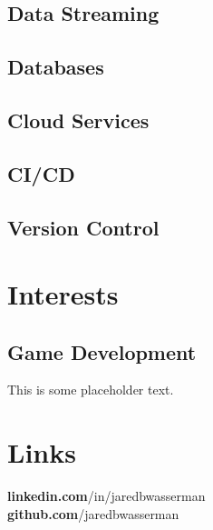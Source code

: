 \documentclass[letterpaper]{resume}
\begin{document}
\begin{minipage}[t]{0.33\textwidth}
\sectionspace %

\subsection{Data Streaming}

\subsection{Databases}

\subsection{Cloud Services}

\subsection{CI/CD}

\subsection{Version Control}

\sectionspace %


\section{Interests}

\subsection{Game Development}
This is some placeholder text.

\sectionspace %


\section{Links}
{\bf linkedin.com}/in/jaredbwasserman \\
{\bf github.com}/jaredbwasserman

\sectionspace %


\end{minipage} %
\end{document}
